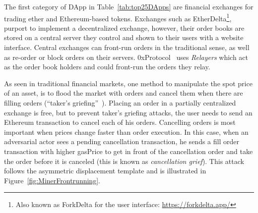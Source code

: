 

The first category of DApp in Table~\ref{tab:top25DApps} are financial exchanges for trading ether and Ethereum-based tokens. Exchanges such as EtherDelta\footnote{Also known as ForkDelta for the user interface: \url{https://forkdelta.app/}}, purport to implement a decentralized exchange, however, their order books are stored on a central server they control and shown to their users with a website interface. Central exchanges can front-run orders in the traditional sense, as well as re-order or block orders on their servers. 0xProtocol~\cite{warren20170x} uses \textit{Relayers} which act as the order book holders and could front-run the orders they relay.

As seen in traditional financial markets, one method to manipulate the spot price of an asset, is to flood the market with orders and cancel them when there are filling orders (``taker's griefing''~\cite{consesnsys0xReview2017}). Placing an order in a partially centralized exchange is free, but to prevent taker's griefing attacks, the user needs to send an Ethereum transaction to cancel each of his orders. Cancelling orders is most important when prices change faster than order execution. In this case, when an adversarial actor sees a pending cancellation transaction, he sends a fill order transaction with higher gasPrice to get in front of the cancellation order and take the order before it is canceled (this is known as \textit{cancellation grief}). This attack follows the asymmetric displacement template and is illustrated in Figure~\ref{fig:MinerFrontrunning}. %

